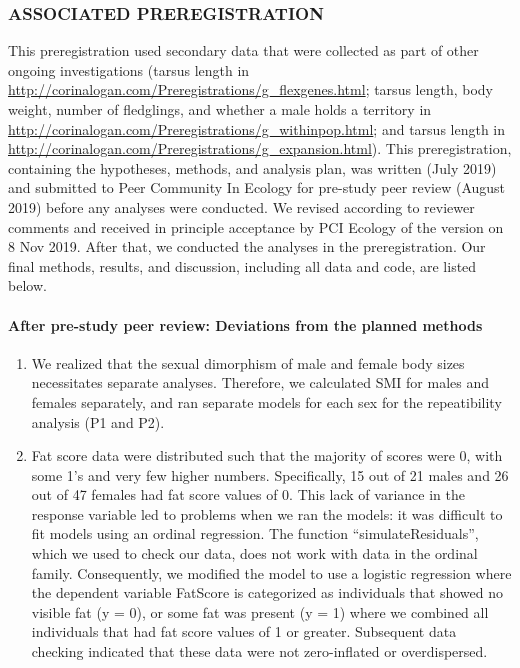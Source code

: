 \documentclass[
]{article}
\begin{document}
\hypertarget{associated-preregistration}{%
\subsubsection{ASSOCIATED
PREREGISTRATION}\label{associated-preregistration}}

This preregistration used secondary data that were collected as part of
other ongoing investigations (tarsus length in
\url{http://corinalogan.com/Preregistrations/g_flexgenes.html}; tarsus
length, body weight, number of fledglings, and whether a male holds a
territory in
\url{http://corinalogan.com/Preregistrations/g_withinpop.html}; and
tarsus length in
\url{http://corinalogan.com/Preregistrations/g_expansion.html}). This
preregistration, containing the hypotheses, methods, and analysis plan,
was written (July 2019) and submitted to Peer Community In Ecology for
pre-study peer review (August 2019) before any analyses were conducted.
We revised according to reviewer comments and received in principle
acceptance by PCI Ecology of the version on 8 Nov 2019. After that, we
conducted the analyses in the preregistration. Our final methods,
results, and discussion, including all data and code, are listed below.

\hypertarget{after-pre-study-peer-review-deviations-from-the-planned-methods}{%
\paragraph{\texorpdfstring{\textbf{After pre-study peer review:
Deviations from the planned
methods}}{After pre-study peer review: Deviations from the planned methods}}\label{after-pre-study-peer-review-deviations-from-the-planned-methods}}

\begin{enumerate}
\def\labelenumi{\arabic{enumi})}
\item
  We realized that the sexual dimorphism of male and female body sizes
  necessitates separate analyses. Therefore, we calculated SMI for males
  and females separately, and ran separate models for each sex for the
  repeatibility analysis (P1 and P2).
\item
  Fat score data were distributed such that the majority of scores were
  0, with some 1's and very few higher numbers. Specifically, 15 out of
  21 males and 26 out of 47 females had fat score values of 0. This lack
  of variance in the response variable led to problems when we ran the
  models: it was difficult to fit models using an ordinal regression.
  The function ``simulateResiduals'', which we used to check our data,
  does not work with data in the ordinal family. Consequently, we
  modified the model to use a logistic regression where the dependent
  variable FatScore is categorized as individuals that showed no visible
  fat (y = 0), or some fat was present (y = 1) where we combined all
  individuals that had fat score values of 1 or greater. Subsequent data
  checking indicated that these data were not zero-inflated or
  overdispersed.
\end{enumerate}
\end{document}
